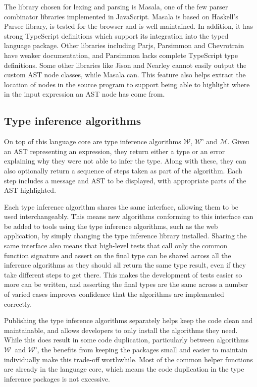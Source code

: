 \documentclass[a4paper,fleqn,oneside,12pt]{report}
\newcommand{\W}{$\mathcal{W}$}
\newcommand{\M}{$\mathcal{M}$}
\begin{document}
The library chosen for lexing and parsing is Masala, one of the few parser combinator libraries implemented in JavaScript. Masala is based on Haskell’s Parsec library, is tested for the browser and is well-maintained. In addition, it has strong TypeScript definitions which support its integration into the typed language package. Other libraries including Parjs, Parsimmon and Chevrotrain have weaker documentation, and Parsimmon lacks complete TypeScript type definitions. Some other libraries like Jison and Nearley cannot easily output the custom AST node classes, while Masala can. This feature also helps extract the location of nodes in the source program to support being able to highlight where in the input expression an AST node has come from.

\subsection{Type inference algorithms}\label{id:h.75leuokwbltp}

On top of this language core are type inference algorithms \W, \W' and \M. Given an AST representing an expression, they return either a type or an error explaining why they were not able to infer the type. Along with these, they can also optionally return a sequence of steps taken as part of the algorithm. Each step includes a message and AST to be displayed, with appropriate parts of the AST highlighted.

Each type inference algorithm shares the same interface, allowing them to be used interchangeably. This means new algorithms conforming to this interface can be added to tools using the type inference algorithms, such as the web application, by simply changing the type inference library installed. Sharing the same interface also means that high-level tests that call only the common function signature and assert on the final type can be shared across all the inference algorithms as they should all return the same type result, even if they take different steps to get there. This makes the development of tests easier so more can be written, and asserting the final types are the same across a number of varied cases improves confidence that the algorithms are implemented correctly.

Publishing the type inference algorithms separately helps keep the code clean and maintainable, and allows developers to only install the algorithms they need. While this does result in some code duplication, particularly between algorithms \W\ and \W', the benefits from keeping the packages small and easier to maintain individually make this trade-off worthwhile. Most of the common helper functions are already in the language core, which means the code duplication in the type inference packages is not excessive.
\end{document}

